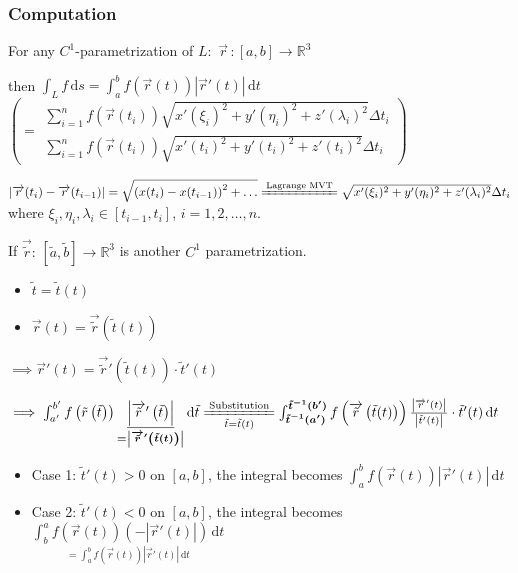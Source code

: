 \subsubsection[数量场在曲线上的积分的计算]{Computation}

For any $C^1$-parametrization of $L:$ $\overrightarrow{r}\,:[a,b]\to\mathbb{R}^3$ 

then $\boxed{\int_L f\,\mathrm{d}s=\int_a^b f\left(\overrightarrow{r}(t)\right)\left|\overrightarrow{r}'(t)\right|\,\mathrm{d}t}$ $\left(=\substack{\textstyle\sum_{i=1}^n f\left(\overrightarrow{r}(t_i)\right)\sqrt{x'(\xi_i)^2+y'(\eta_i)^2+z'(\lambda_i)^2}\Delta t_i\\
            \textstyle\sum_{i=1}^n f\left(\overrightarrow{r}(t_i)\right)\sqrt{x'(t_i)^2+y'(t_i)^2+z'(t_i)^2}\Delta t_i}\right)$

$\left|\overrightarrow{r}(t_i)-\overrightarrow{r}(t_{i-1})\right|=\sqrt{\left(x(t_i)-x(t_{i-1})\right)^2+\dots}\xlongequal{\text{Lagrange MVT}}\sqrt{x'(\xi_i)^2+y'(\eta_i)^2+z'(\lambda_i)^2}\Delta t_i$ where $\xi_i,\eta_i,\lambda_i\in\left[t_{i-1},t_i\right]$, $i=1,2,\dots,n$.

If $\overrightarrow{\tilde{r}}:\,\left[\tilde{a},\tilde{b}\right]\to\mathbb{R}^3$ is another $C^1$ parametrization. 

\begin{itemize}
    \item $\tilde{t}=\tilde{t}(t)$ 
    \item $\overrightarrow{r}(t)=\overrightarrow{\tilde{r}}\left(\tilde{t}(t)\right)$
\end{itemize}

$\implies\overrightarrow{r}'(t)=\overrightarrow{\tilde{r}}'\left(\tilde{t}(t)\right)\cdot\tilde{t}'(t)$

$\implies\int_{a'}^{b'}f\left(\tilde{r}\left(\tilde{t}\right)\right)\underset{\boldsymbol{=\left|\overrightarrow{\tilde{r}}'\left(\tilde{t}(t)\right)\right|}}{\underline{\left|\overrightarrow{\tilde{r}}'\left(\tilde{t}\right)\right|}}\,\mathrm{d}\tilde{t}\xlongequal[\tilde{t}=\tilde{t}(t)]{\text{Substitution}}\int_{\boldsymbol{\tilde{t}^{-1}(a')}}^{\boldsymbol{\tilde{t}^{-1}(b')}}f\left(\overrightarrow{\tilde{r}}\left(\tilde{t}(t)\right)\right)\frac{\left|\overrightarrow{r}'(t)\right|}{\left|\tilde{t}'(t)\right|}\cdot\tilde{t}'(t)\,\mathrm{d}t$

\begin{itemize}
    \item Case 1: $\tilde{t}'(t)>0$ on $[a,b]$, the integral becomes $\int_a^b f\left(\overrightarrow{r}(t)\right)\left|\overrightarrow{r}'(t)\right|\,\mathrm{d}t$
    \item Case 2: $\tilde{t}'(t)<0$ on $[a,b]$, the integral becomes $\underset{=\int_a^b f\left(\overrightarrow{r}(t)\right)\left|\overrightarrow{r}'(t)\right|\,\mathrm{d}t}{\int_b^a f\left(\overrightarrow{r}(t)\right)\left(-\left|\overrightarrow{r}'(t)\right|\right)\,\mathrm{d}t}$
\end{itemize}

